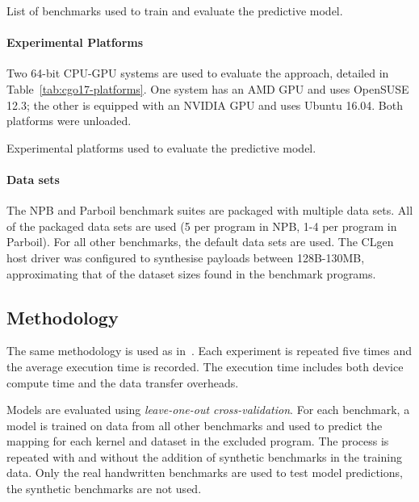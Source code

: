 \begin{table}%
  \centering%
  
  \caption[Benchmarks used in evaluation]{List of benchmarks used to train and evaluate the \citeauthor{Grewe2013} predictive model.} %
  \label{tab:cgo17-benchmarks} %
\end{table}

\paragraph*{Experimental Platforms}

Two 64-bit CPU-GPU systems are used to evaluate the approach, detailed in Table~\ref{tab:cgo17-platforms}. One system has an AMD GPU and uses OpenSUSE 12.3; the other is equipped with an NVIDIA GPU and uses Ubuntu 16.04. Both platforms were unloaded.

\begin{table}%
  \centering %
	
  \caption[Experimental platforms used in evaluation]{Experimental platforms used to evaluate the \citeauthor{Grewe2013} predictive model.}
  \label{tab:cgo17-platforms}
\end{table}

\paragraph*{Data sets}

The NPB and Parboil benchmark suites are packaged with multiple data sets. All of the packaged data sets are used (5 per program in NPB, 1-4 per program in Parboil). For all other benchmarks, the default data sets are used. The CLgen host driver was configured to synthesise payloads between 128B-130MB, approximating that of the dataset sizes found in the benchmark programs.


\subsection{Methodology}

The same methodology is used as in~\cite{Grewe2013}. Each experiment is repeated five times and the average execution time is recorded. The execution time includes both device compute time and the data transfer overheads.

Models are evaluated using \emph{leave-one-out cross-validation}. For each benchmark, a model is trained on data from all other benchmarks and used to predict the mapping for each kernel and dataset in the excluded program. The process is repeated with and without the addition of synthetic benchmarks in the training data. Only the real handwritten benchmarks are used to test model predictions, the synthetic benchmarks are not used.
